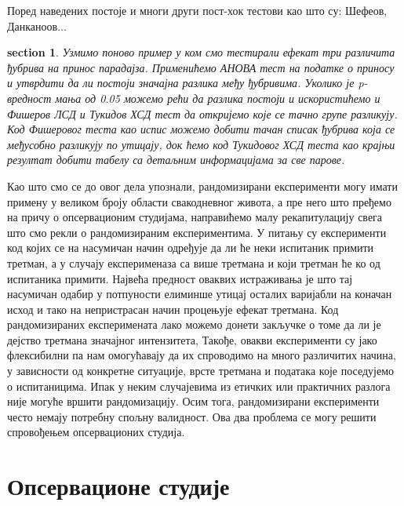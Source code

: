 \documentclass[12pt, a4paper]{article}
\newtheorem{primer}[Пример]{section}
\begin{document}
Поред наведених постоје и многи други пост-хок тестови као што су: Шефеов, Данканоов... 

\begin{primer}
Узмимо поново пример у ком смо тестирали ефекат три различита ђубрива на принос парадајза. Применићемо 
АНОВА тест на податке о приносу и утврдити да ли постоји значајна разлика међу ђубривима. Уколико 
је p-вредност мања од 0.05 можемо рећи да разлика постоји и искористићемо и Фишеров ЛСД и Тукидов 
ХСД тест да откријемо које се тачно групе разликују. Код Фишеровог теста као испис можемо добити 
тачан списак ђубрива која се међусобно разликују по утицају, док ћемо код Тукидовог ХСД теста као 
крајњи резултат добити табелу са детаљним информацијама за све парове.
\end{primer}

Као што смо се до овог дела упознали, рандомизирани експерименти могу имати примену у великом 
броју области свакодневног живота, а пре него што пређемо на причу о опсервационим студијама, 
направићемо малу рекапитулацију свега што смо рекли о рандомизираним експериментима.
У питању су експерименти код којих се на насумичан начин одређује да ли ће неки испитаник примити 
третман, а у случају експерименаза са више третмана и који третман ће ко од испитаника примити.
Највећа предност оваквих истраживања је што тај насумичан одабир у потпуности елиминше утицај 
осталих варијабли на коначан исход и тако на непристрасан начин процењује ефекат третмана.
Код рандомизираних експеримената лако можемо донети закључке о томе да ли је дејство третмана 
значајног интензитета,
Такође, овакви експерименти су јако флексибилни па нам омогућавају да их спроводимо на много 
различитих начина, у зависности од конкретне ситуације, врсте третмана и података које поседујемо 
о испитаницима.
Ипак у неким случајевима из етичких или практичних разлога није могуће вршити рандомизацију.
Осим тога, рандомизирани експерименти често немају потребну спољну валидност. 
Ова два проблема се могу решити спровођењем опсервационих студија.

\newpage



\section{Опсервационе студије}
\end{document}

